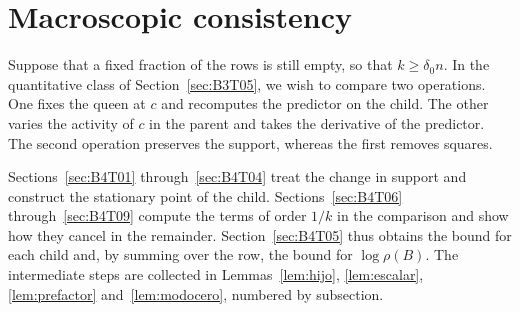\section{Macroscopic consistency}\label{sec:macro}

Suppose that a fixed fraction of the rows is still empty, so that $k\ge\delta_0 n$.
In the quantitative class of Section~\ref{sec:B3T05}, we wish to compare two operations.
One fixes the queen at $c$ and recomputes the predictor on the child.
The other varies the activity of $c$ in the parent and takes the derivative of the predictor.
The second operation preserves the support, whereas the first removes squares.

Sections~\ref{sec:B4T01} through~\ref{sec:B4T04} treat the change in support and construct the stationary
point of the child. Sections~\ref{sec:B4T06} through~\ref{sec:B4T09} compute the terms of order $1/k$ in the
comparison and show how they cancel in the remainder.
Section~\ref{sec:B4T05} thus obtains the bound for each child and, by summing over the row, the bound for
$\log\rho(B)$. The intermediate steps are collected in
Lemmas~\ref{lem:hijo}, \ref{lem:escalar}, \ref{lem:prefactor} and~\ref{lem:modocero}, numbered by
subsection.
